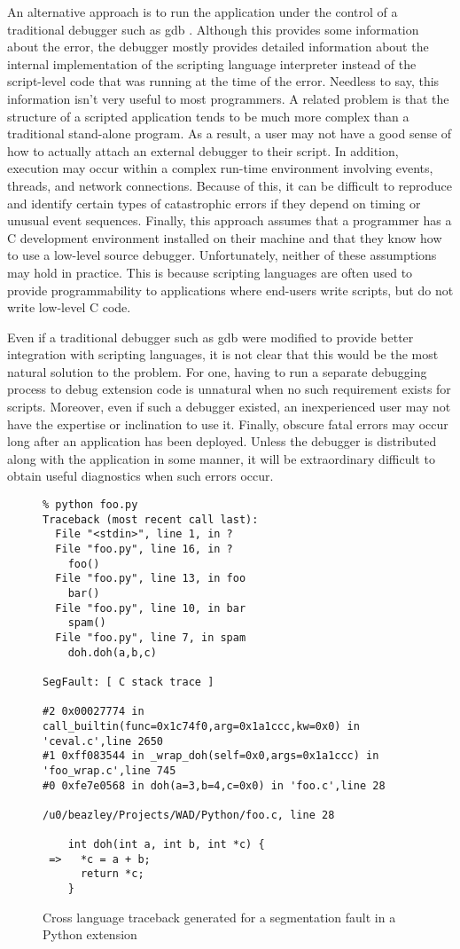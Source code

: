 An alternative approach is to run the application under the control of
a traditional debugger such as gdb \cite{gdb}.  Although this provides
some information about the error, the debugger mostly provides
detailed information about the internal implementation of the
scripting language interpreter instead of the script-level code that
was running at the time of the error.  Needless to say, this information 
isn't very useful to most programmers.
A related problem is that
the structure of a scripted application tends to be much more complex
than a traditional stand-alone program.  As a result, a user may not
have a good sense of how to actually attach an external debugger to their
script.  In addition, execution may occur within a
complex run-time environment involving events, threads, and network
connections.  Because of this, it can be difficult to reproduce
and identify certain types of catastrophic errors if they depend on
timing or unusual event sequences. Finally, this approach
assumes that a programmer has a C development environment installed on
their machine and that they know how to use a low-level source
debugger.  Unfortunately, neither of these assumptions may hold in practice.
This is because scripting languages are often used to provide programmability to
applications where end-users write scripts, but do not write low-level C code.

Even if a traditional debugger such as gdb were modified to provide
better integration with scripting languages, it is not clear that this
would be the most natural solution to the problem.  For one, 
having to run a separate debugging process to debug
extension code is unnatural when no such requirement exists for
scripts.  Moreover, even if such a debugger existed, an
inexperienced user may not have the expertise or inclination to use
it.  Finally, obscure fatal errors may occur long after an application
has been deployed.  Unless the debugger is distributed along with the
application in some manner, it will be extraordinary difficult to
obtain useful diagnostics when such errors occur.

\begin{figure*}[t]
{\small
\begin{verbatim}
% python foo.py
Traceback (most recent call last):
  File "<stdin>", line 1, in ?
  File "foo.py", line 16, in ?
    foo()
  File "foo.py", line 13, in foo
    bar()
  File "foo.py", line 10, in bar
    spam()
  File "foo.py", line 7, in spam
    doh.doh(a,b,c)

SegFault: [ C stack trace ]

#2 0x00027774 in call_builtin(func=0x1c74f0,arg=0x1a1ccc,kw=0x0) in 'ceval.c',line 2650
#1 0xff083544 in _wrap_doh(self=0x0,args=0x1a1ccc) in 'foo_wrap.c',line 745
#0 0xfe7e0568 in doh(a=3,b=4,c=0x0) in 'foo.c',line 28

/u0/beazley/Projects/WAD/Python/foo.c, line 28

    int doh(int a, int b, int *c) {
 =>   *c = a + b;
      return *c;
    }
\end{verbatim}
}
\caption{Cross language traceback generated for a segmentation fault in a Python extension}
\end{figure*}

